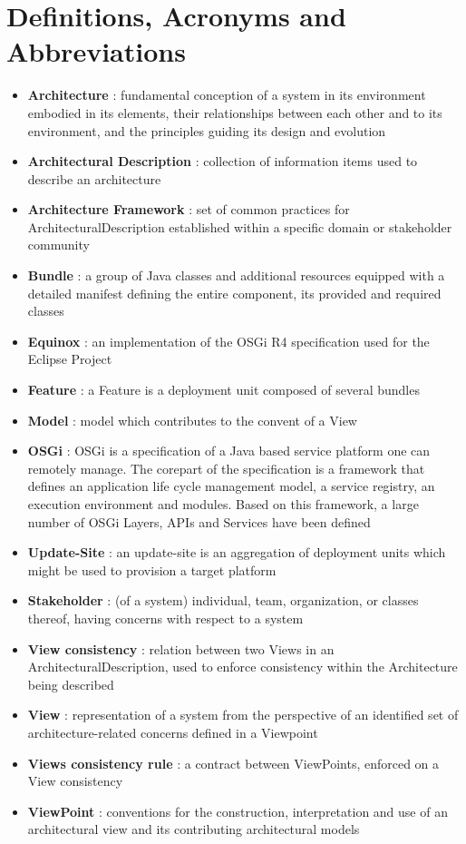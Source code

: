 \documentclass{gemoc} %
\begin{document}
\section{Definitions, Acronyms and Abbreviations}
\begin{itemize}
	\item \textbf{Architecture}  : fundamental conception of a system in its environment
 embodied in its elements, their relationships between each other and to its 
environment, and the principles guiding its design and evolution
	\item \textbf{Architectural Description} : collection of information items used to describe an architecture
	\item \textbf{Architecture Framework} : set of common practices for ArchitecturalDescription established within a specific domain or stakeholder community
	\item \textbf{Bundle} : a group of Java classes and additional resources equipped with a detailed manifest defining the entire component, its provided and required classes
	\item \textbf{Equinox} : an implementation of the OSGi R4 specification used for the Eclipse Project
	\item \textbf{Feature} : a Feature is a deployment unit composed of several bundles
	\item \textbf{Model} : model which contributes to the convent of a View
	\item \textbf{OSGi} : OSGi is a specification of a Java based service platform one can remotely manage. The corepart of the specification is a framework that defines an application life cycle management model, a service registry, an execution environment and modules. Based on this framework, a large number of OSGi Layers, APIs and Services have been defined
	\item \textbf{Update-Site} : an update-site is an aggregation of deployment units which might be used to provision a target platform
	\item \textbf{Stakeholder} : (of a system) individual, team, organization, or classes thereof, having concerns with respect to a system 
	\item \textbf {View consistency} : relation between two Views in an ArchitecturalDescription, used to enforce consistency within the Architecture being described
	\item \textbf{View} : representation of a system from the perspective of an identified set of architecture-related concerns defined in a Viewpoint
	\item \textbf{Views consistency rule} : a contract between ViewPoints, enforced on a View consistency
	\item \textbf{ViewPoint} : conventions for the construction, interpretation and use of an architectural view and its contributing architectural models
\end{itemize}
\end{document}
